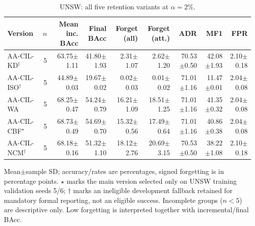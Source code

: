\begin{table}[t]
\centering\scriptsize
\setlength{\tabcolsep}{3.3pt}
\caption{UNSW: all five retention variants at $\alpha=2\%$.}\label{tab:section298-all-unsw_nb15}
\begin{tabular}{lrrrrrrrr}
\toprule
Version & $n$ & Mean inc. BAcc & Final BAcc & Forget (all) & Forget (att.) & ADR & MF1 & FPR \\
\midrule
AA-CIL-KD$^\dagger$ & 5 & 63.75$\pm$1.11 & 41.80$\pm$1.93 & 2.31$\pm$1.07 & 2.62$\pm$1.20 & 70.53$\pm$0.50 & 42.08$\pm$1.93 & 2.10$\pm$0.18 \\
AA-CIL-ISO$^\dagger$ & 5 & 44.89$\pm$0.03 & 19.67$\pm$0.02 & 0.02$\pm$0.03 & 0.01$\pm$0.02 & 71.01$\pm$1.16 & 11.47$\pm$0.01 & 2.04$\pm$0.08 \\
AA-CIL-WA & 5 & 68.25$\pm$0.47 & 54.24$\pm$0.79 & 16.21$\pm$1.09 & 18.51$\pm$1.25 & 71.01$\pm$1.16 & 41.35$\pm$0.32 & 2.04$\pm$0.08 \\
AA-CIL-CBF$^\star$ & 5 & 68.73$\pm$0.49 & 54.69$\pm$0.70 & 15.32$\pm$0.56 & 17.49$\pm$0.64 & 71.01$\pm$1.16 & 40.86$\pm$0.38 & 2.04$\pm$0.08 \\
AA-CIL-NCM$^\dagger$ & 5 & 68.18$\pm$0.16 & 51.32$\pm$1.10 & 18.12$\pm$2.76 & 20.69$\pm$3.15 & 70.53$\pm$0.50 & 38.22$\pm$1.08 & 2.10$\pm$0.18 \\
\bottomrule
\end{tabular}
\par\smallskip\begin{minipage}{0.98\textwidth}\scriptsize Mean$\pm$sample SD; accuracy/rates are percentages, signed forgetting is in percentage points. $\star$ marks the main version selected only on UNSW training validation seeds 5/6; $\dagger$ marks an ineligible development fallback retained for mandatory formal reporting, not an eligible success. Incomplete groups ($n<5$) are descriptive only. Low forgetting is interpreted together with incremental/final BAcc.\end{minipage}
\end{table}

